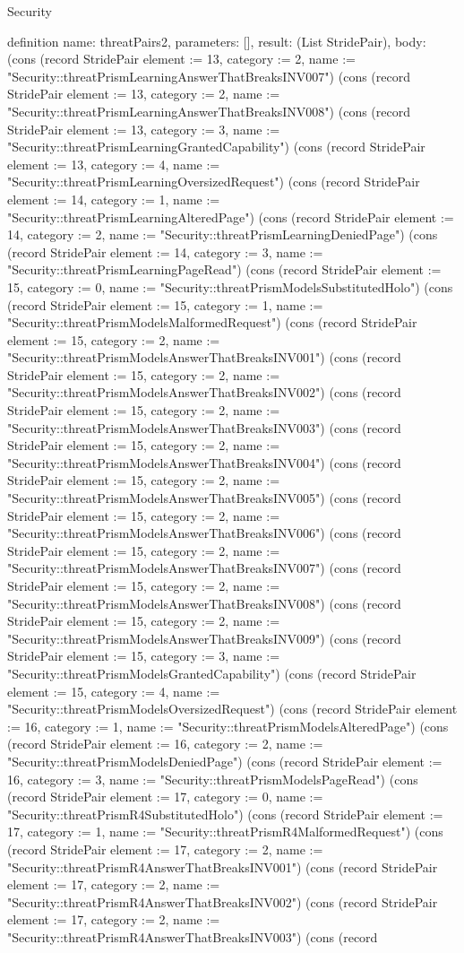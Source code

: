 \begin{lexlean}{Security}
\begin{semanticmodule}
definition{
  name: threatPairs2,
  parameters: [],
  result: (List StridePair),
  body: (cons (record StridePair {element := 13, category := 2, name := "Security::threatPrismLearningAnswerThatBreaksINV007"}) (cons (record StridePair {element := 13, category := 2, name := "Security::threatPrismLearningAnswerThatBreaksINV008"}) (cons (record StridePair {element := 13, category := 3, name := "Security::threatPrismLearningGrantedCapability"}) (cons (record StridePair {element := 13, category := 4, name := "Security::threatPrismLearningOversizedRequest"}) (cons (record StridePair {element := 14, category := 1, name := "Security::threatPrismLearningAlteredPage"}) (cons (record StridePair {element := 14, category := 2, name := "Security::threatPrismLearningDeniedPage"}) (cons (record StridePair {element := 14, category := 3, name := "Security::threatPrismLearningPageRead"}) (cons (record StridePair {element := 15, category := 0, name := "Security::threatPrismModelsSubstitutedHolo"}) (cons (record StridePair {element := 15, category := 1, name := "Security::threatPrismModelsMalformedRequest"}) (cons (record StridePair {element := 15, category := 2, name := "Security::threatPrismModelsAnswerThatBreaksINV001"}) (cons (record StridePair {element := 15, category := 2, name := "Security::threatPrismModelsAnswerThatBreaksINV002"}) (cons (record StridePair {element := 15, category := 2, name := "Security::threatPrismModelsAnswerThatBreaksINV003"}) (cons (record StridePair {element := 15, category := 2, name := "Security::threatPrismModelsAnswerThatBreaksINV004"}) (cons (record StridePair {element := 15, category := 2, name := "Security::threatPrismModelsAnswerThatBreaksINV005"}) (cons (record StridePair {element := 15, category := 2, name := "Security::threatPrismModelsAnswerThatBreaksINV006"}) (cons (record StridePair {element := 15, category := 2, name := "Security::threatPrismModelsAnswerThatBreaksINV007"}) (cons (record StridePair {element := 15, category := 2, name := "Security::threatPrismModelsAnswerThatBreaksINV008"}) (cons (record StridePair {element := 15, category := 2, name := "Security::threatPrismModelsAnswerThatBreaksINV009"}) (cons (record StridePair {element := 15, category := 3, name := "Security::threatPrismModelsGrantedCapability"}) (cons (record StridePair {element := 15, category := 4, name := "Security::threatPrismModelsOversizedRequest"}) (cons (record StridePair {element := 16, category := 1, name := "Security::threatPrismModelsAlteredPage"}) (cons (record StridePair {element := 16, category := 2, name := "Security::threatPrismModelsDeniedPage"}) (cons (record StridePair {element := 16, category := 3, name := "Security::threatPrismModelsPageRead"}) (cons (record StridePair {element := 17, category := 0, name := "Security::threatPrismR4SubstitutedHolo"}) (cons (record StridePair {element := 17, category := 1, name := "Security::threatPrismR4MalformedRequest"}) (cons (record StridePair {element := 17, category := 2, name := "Security::threatPrismR4AnswerThatBreaksINV001"}) (cons (record StridePair {element := 17, category := 2, name := "Security::threatPrismR4AnswerThatBreaksINV002"}) (cons (record StridePair {element := 17, category := 2, name := "Security::threatPrismR4AnswerThatBreaksINV003"}) (cons (record }
\end{semanticmodule}
\end{lexlean}
